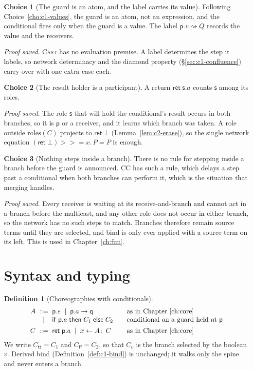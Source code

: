 \documentclass[11pt]{report}
\theoremstyle{plain}
\theoremstyle{definition}
\newtheorem{definition}[theorem]{Definition}
\newtheorem{choice}{Choice}[chapter]
\theoremstyle{remark}
\newcommand{\kw}[1]{\mathsf{#1}}
\newcommand{\pp}{\mathsf{p}}
\newcommand{\qq}{\mathsf{q}}
\newcommand{\sr}{\mathsf{s}}
\newcommand{\ttrue}{\kw{tt}}
\newcommand{\ffalse}{\kw{ff}}
\newcommand{\bind}[3]{#1 \leftarrow #2\,;\;#3}
\newcommand{\cret}[1]{\kw{ret}\;#1}
\newcommand{\com}[3]{#1.#2 \to #3}
\newcommand{\cif}[4]{\kw{if}\;#1.#2\;\kw{then}\;#3\;\kw{else}\;#4}
\newcommand{\mbind}[3]{#1 \mathbin{>\!\!>\!\!=} #2.\,#3}
\newcommand{\roles}[1]{\mathrm{roles}(#1)}
\newcommand{\castlbl}[3]{#1.#2 \rightsquigarrow #3}
\newcommand{\rn}[1]{{\normalfont\scshape #1}}
\begin{document}
\begin{choice}[The guard is an atom, and the label carries its value]\label{cho:c2-guard}
  Following Choice~\ref{cho:c1-values}, the guard is an atom, not an
  expression, and the conditional fires only when the guard is a value.  The
  label $\castlbl{\pp}{v}{Q}$ records the value and the receivers.

  \emph{Proof saved.}  \rn{Cast} has no evaluation premise.  A label
  determines the step it labels, so network determinacy and the diamond
  property (\S\ref{sec:c1-confluence}) carry over with one extra case each.
\end{choice}

\begin{choice}[The result holder is a participant]\label{cho:c2-ret}
  A return $\cret{\sr.a}$ counts $\sr$ among its roles.

  \emph{Proof saved.}  The role $\sr$ that will hold the conditional's result
  occurs in both branches, so it is $\pp$ or a receiver, and it learns which
  branch was taken.  A role outside $\roles{C}$ projects to
  $\kw{ret}\;\bot$ (Lemma~\ref{lem:c2-erase}), so the single network equation
  $\mbind{(\kw{ret}\;\bot)}{x}{P}=P$ is enough.
\end{choice}

\begin{choice}[Nothing steps inside a branch]\label{cho:c2-nobranch}
  There is no rule for stepping inside a branch before the guard is
  announced.  CC has such a rule, which delays a step past a
  conditional when both branches can perform it, which is the situation
  that merging handles.

  \emph{Proof saved.}  Every receiver is waiting at its receive-and-branch
  and cannot act in a branch before the multicast, and any other role does
  not occur in either branch, so the network has no such steps to match.
  Branches therefore remain source terms until they are selected, and bind is
  only ever applied with a source term on its left.  This is used in
  Chapter~\ref{ch:fun}.
\end{choice}

\section{Syntax and typing}
\label{sec:c2-syntax}

\begin{definition}[Choreographies with conditionals]\label{def:c2-syntax}
  \[
  \begin{array}{r@{\;\;}c@{\;\;}l@{\qquad}l}
    A & ::= & \pp.e \;\mid\; \com{\pp}{a}{\qq} & \text{as in Chapter~\ref{ch:core}}\\
      & \mid & \cif{\pp}{a}{C_1}{C_2} & \text{conditional on a guard held at } \pp\\[1ex]
    C & ::= & \cret{\pp.a} \;\mid\; \bind{x}{A}{C} & \text{as in Chapter~\ref{ch:core}}
  \end{array}
  \]
  We write $C_\ttrue=C_1$ and $C_\ffalse=C_2$, so that $C_v$ is the branch
  selected by the boolean $v$.  Derived bind (Definition~\ref{def:c1-bind}) is
  unchanged; it walks only the spine and never enters a branch.
\end{definition}
\end{document}
